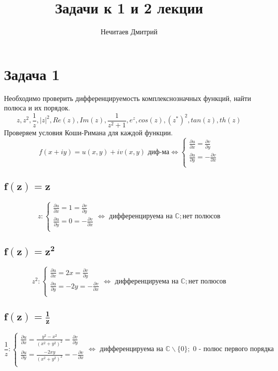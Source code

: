 \documentclass[12pt]{article}
\title{Задачи к 1 и 2 лекции}
\author{Нечитаев Дмитрий}
\begin{document}
 
	\maketitle
	\section*{Задача 1}
	Необходимо проверить дифференцируемость комплекснозначных функций, найти полюса и их порядок.
	$$z, z^{2}, \frac{1}{z}, |z|^2, Re(z), Im(z), \frac{1}{z^{2}+1}, e^z, cos(z), (z^*)^{2}, tan(z), th(z)$$
	Проверяем условия Коши-Римана для каждой функции. 
	\begin{equation*}
	f(x+iy) = u(x,y)+iv(x,y) \text{ диф-ма} \Leftrightarrow
	\begin{cases}
	\frac{\partial u}{\partial x} = \frac{\partial v}{\partial y} \\
	\frac{\partial u}{\partial y} = -\frac{\partial v}{\partial x} \\
	\end{cases}
	\end{equation*}
\subsection*{$\mathbf{f(z) = z}$}
\begin{equation*}
z:
\begin{cases}
	\frac{\partial u}{\partial x} = 1 = \frac{\partial v}{\partial y} \\
	\frac{\partial u}{\partial y} = 0 = -\frac{\partial v}{\partial x} \\
\end{cases}
\Leftrightarrow
\text{ дифференцируема на } \mathbb{C} ; \text{нет полюсов}
\end{equation*}
\subsection*{$\mathbf{f(z) = z^2}$}
\begin{equation*}
z^2:
\begin{cases}
\frac{\partial u}{\partial x} = 2x = \frac{\partial v}{\partial y} \\
\frac{\partial u}{\partial y} = -2y = -\frac{\partial v}{\partial x} \\
\end{cases}
\Leftrightarrow
\text{ дифференцируема на } \mathbb{C} ; \text{нет полюсов}
\end{equation*}
\subsection*{$\mathbf{f(z) = \frac{1}{z}}$}
\begin{equation*}
\frac{1}{z}:
\begin{cases}
\frac{\partial u}{\partial x} = \frac{y^2-x^2}{(x^2+y^2)^2} = \frac{\partial v}{\partial y} \\
\frac{\partial u}{\partial y} = \frac{-2xy}{(x^2+y^2)^2} = -\frac{\partial v}{\partial x} \\
\end{cases}
\Leftrightarrow
\text{ дифференцируема на } \mathbb{C}\backslash \{0\}; \text{ 0 - полюс первого порядка}
\end{equation*}
\end{document}
